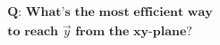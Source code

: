\documentclass[preview]{standalone}
\begin{document}
\begin{align*}
\textbf{Q: What's the most efficient way} \\ \textbf{to reach} \,\, \vec{y} \,\, \textbf{from the xy-plane?}
\end{align*}
\end{document}
